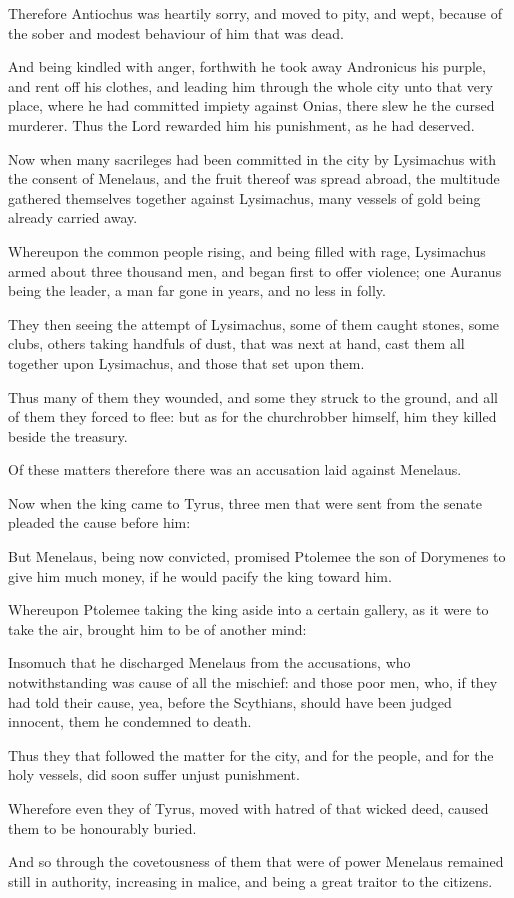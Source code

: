 {\par }{\PP {}Therefore Antiochus was heartily sorry, and moved to pity, and wept, because of the sober and modest behaviour of him that was dead.
\par }{\PP {}And being kindled with anger, forthwith he took away Andronicus his purple, and rent off his clothes, and leading him through the whole city unto that very place, where he had committed impiety against Onias, there slew he the cursed murderer. Thus the Lord rewarded him his punishment, as he had deserved.
\par }{\PP {}Now when many sacrileges had been committed in the city by Lysimachus with the consent of Menelaus, and the fruit thereof was spread abroad, the multitude gathered themselves together against Lysimachus, many vessels of gold being already carried away.
\par }{\PP {}Whereupon the common people rising, and being filled with rage, Lysimachus armed about three thousand men, and began first to offer violence; one Auranus being the leader, a man far gone in years, and no less in folly.
\par }{\PP {}They then seeing the attempt of Lysimachus, some of them caught stones, some clubs, others taking handfuls of dust, that was next at hand, cast them all together upon Lysimachus, and those that set upon them.
\par }{\PP {}Thus many of them they wounded, and some they struck to the ground, and all of them they forced to flee: but as for the churchrobber himself, him they killed beside the treasury.
\par }{\PP {}Of these matters therefore there was an accusation laid against Menelaus.
\par }{\PP {}Now when the king came to Tyrus, three men that were sent from the senate pleaded the cause before him:
\par }{\PP {}But Menelaus, being now convicted, promised Ptolemee the son of Dorymenes to give him much money, if he would pacify the king toward him.
\par }{\PP {}Whereupon Ptolemee taking the king aside into a certain gallery, as it were to take the air, brought him to be of another mind:
\par }{\PP {}Insomuch that he discharged Menelaus from the accusations, who notwithstanding was cause of all the mischief: and those poor men, who, if they had told their cause, yea, before the Scythians, should have been judged innocent, them he condemned to death.
\par }{\PP {}Thus they that followed the matter for the city, and for the people, and for the holy vessels, did soon suffer unjust punishment.
\par }{\PP {}Wherefore even they of Tyrus, moved with hatred of that wicked deed, caused them to be honourably buried.
\par }{\PP {}And so through the covetousness of them that were of power Menelaus remained still in authority, increasing in malice, and being a great traitor to the citizens.

}
